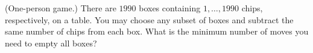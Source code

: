 (One-person game.) There are $1990$ boxes containing $1, \ldots, 1990$ chips, respectively, on a table. You may choose any subset of boxes and subtract the same number of chips from each box. What is the minimum number of moves you need to empty all boxes?
